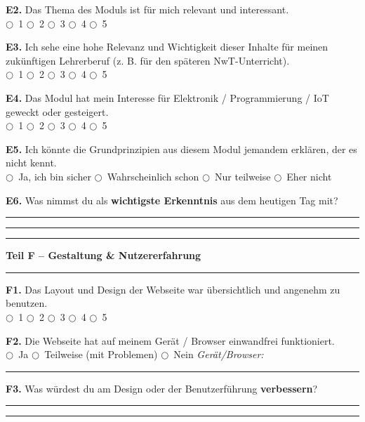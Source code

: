 \documentclass[a4paper,10pt]{article}
\newcommand{\radio}{\textsf{\Large$\bigcirc$}}
\newcommand{\linefill}{\rule{\linewidth}{0.4pt}\vspace{1.2ex}}
\begin{document}
\vspace{5pt}
\textbf{E2.} Das Thema des Moduls ist für mich relevant und interessant.\\
\radio~1 \quad \radio~2 \quad \radio~3 \quad \radio~4 \quad \radio~5

\vspace{5pt}
\textbf{E3.} Ich sehe eine hohe Relevanz und Wichtigkeit dieser Inhalte für meinen zukünftigen Lehrerberuf (z. B. für den späteren NwT-Unterricht).\\
\radio~1 \quad \radio~2 \quad \radio~3 \quad \radio~4 \quad \radio~5

\vspace{5pt}
\textbf{E4.} Das Modul hat mein Interesse für Elektronik / Programmierung / IoT geweckt oder gesteigert.\\
\radio~1 \quad \radio~2 \quad \radio~3 \quad \radio~4 \quad \radio~5

\vspace{5pt}
\textbf{E5.} Ich könnte die Grundprinzipien aus diesem Modul jemandem erklären, der es nicht kennt.\\
\radio~Ja, ich bin sicher \quad \radio~Wahrscheinlich schon \quad \radio~Nur teilweise \quad \radio~Eher nicht

\vspace{5pt}
\textbf{E6.} Was nimmst du als \textbf{wichtigste Erkenntnis} aus dem heutigen Tag mit?\\
\linefill
\linefill
\linefill

\vspace{8pt}

{\large \bfseries \color{primary} Teil F – Gestaltung \& Nutzererfahrung}\\[-4pt]
\color{accent}\rule{\linewidth}{1.5pt}\color{black}\vspace{4pt}

\textbf{F1.} Das Layout und Design der Webseite war übersichtlich und angenehm zu benutzen.\\
\radio~1 \quad \radio~2 \quad \radio~3 \quad \radio~4 \quad \radio~5

\vspace{5pt}
\textbf{F2.} Die Webseite hat auf meinem Gerät / Browser einwandfrei funktioniert.\\
\radio~Ja \quad \radio~Teilweise (mit Problemen) \quad \radio~Nein \quad \textit{Gerät/Browser:} \rule{4cm}{0.4pt}

\vspace{5pt}
\textbf{F3.} Was würdest du am Design oder der Benutzerführung \textbf{verbessern}?\\
\linefill
\linefill
\end{document}
